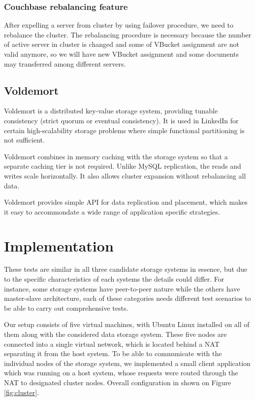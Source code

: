 \documentclass[a4paper]{article}
\begin{document}
\subsubsection*{Couchbase rebalancing feature}
After expelling a server from cluster by using failover procedure, we need to rebalance the cluster. The rebalancing procedure is necessary because the number of active server in cluster is changed and some of VBucket assignment are not valid anymore, so we will have new VBucket assignment and some documents may transferred among different servers.


\subsection*{Voldemort}

Voldemort is a distributed key-value storage system, providing tunable consistency (strict quorum or eventual consistency). It is used in LinkedIn for certain 
high-scalability storage problems where simple functional partitioning is not sufficient. 

Voldemort combines in memory caching with the storage system so that a separate caching tier is not required. Unlike MySQL replication, the reads and writes scale horizontally. It also allows cluster expansion without rebalancing all data.

Voldemort provides simple API for data replication and placement, which makes it easy to accommondate a wide range of application specific strategies.


\section{Implementation}

These tests are similar in all three candidate storage systems in essence, but due to the specific characteristics of each systems the details could differ. 
For instance, some storage systems have peer-to-peer nature while the others have master-slave architecture, each of these categories needs different test scenarios to be able to carry out comprehensive tests.

Our setup consists of five virtual machines, with Ubuntu Linux installed on all of them along with the considered data storage system. 
These five nodes are connected into a single virtual network, which is located behind a NAT separating it from the host system.
To be able to communicate with the individual nodes of the storage system, we implemented a small client application which was running on a host system, whose requests were routed through the NAT to designated cluster nodes. 
Overall configuration in shown on Figure \ref{fig:cluster}. 
\end{document}
